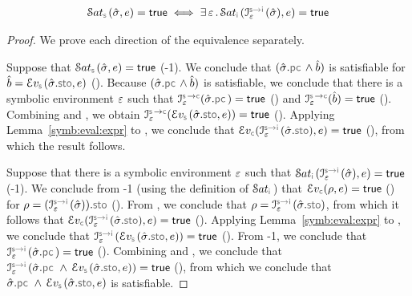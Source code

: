\begin{lemma}
$$
\begin{array}{l}
      \abssat{\symbolic}(\sstate, \jsilexpr) = \jtrue   
      \iff  \exists \, \senv \, . \, 
          \abssat{\instrumented}(\interpret{\symbinst}{\senv}(\sstate), \jsilexpr) = \jtrue
\end{array}
$$
\end{lemma}
\begin{proof}
We prove each direction of the equivalence separately. 
\vspace{5pt}

\noindent {} 
Suppose that $\abssat{\symbolic}(\sstate, \jsilexpr) = \jtrue$ (\hyp{1}).
We conclude that $(\sstate.\pcsel \wedge \sexprb)$ is satisfiable for 
$\sexprb = \evalexpr{\symbolic}(\sstate.\stosel, \jsilexpr)$ (). 
Because  $(\sstate.\pcsel \wedge \sexprb)$  is satisfiable, we conclude that 
there is a symbolic environment $\senv$ such that $\interpret{\symbconc}{\senv}(\sstate.\pcsel) = \jtrue$ ()
and  $\interpret{\symbconc}{\senv}(\sexprb) = \jtrue$ (). 
Combining  and , we obtain $\interpret{\symbconc}{\senv}(\evalexpr{\symbolic}(\sstate.\stosel, \jsilexpr)) = \jtrue$  (). 
Applying Lemma~\ref{symb:eval:expr} to , we conclude that
$\evalexpr{\concrete}(\interpret{\symbinst}{\senv}(\sstate.\stosel), \jsilexpr) = \jtrue$ (), 
from which the result follows. 
\vspace{3pt}

\noindent {} 
Suppose that there is a symbolic environment $\senv$ such that 
$\abssat{\instrumented}(\interpret{\symbinst}{\senv}(\sstate), \jsilexpr) = \jtrue$ (\hyp{1}). 
We conclude from \hyp{1} (using the definition of $\abssat{\instrumented}$) that 
$\evalexpr{\concrete}(\store, \jsilexpr) = \jtrue$ () for 
$\store = (\interpret{\symbinst}{\senv}(\sstate)).\stosel$ (). 
From , we conclude that $\store = \interpret{\symbinst}{\senv}(\sstate.\stosel)$, 
from which it follows that 
$\evalexpr{\concrete}(\interpret{\symbinst}{\senv}(\sstate.\stosel), \jsilexpr) = \jtrue$ (). 
Applying Lemma~\ref{symb:eval:expr} to , we conclude that
$\interpret{\symbinst}{\senv}(\evalexpr{\symbolic}(\sstate.\stosel, \jsilexpr)) = \jtrue$ ().
 From \hyp{1}, we conclude that $\interpret{\symbinst}{\senv}(\sstate.\pcsel) = \jtrue$ (). 
 Combining  and , we conclude that $\interpret{\symbinst}{\senv}(\sstate.\pcsel \, \wedge \, \evalexpr{\symbolic}(\sstate.\stosel, \jsilexpr)) = \jtrue$ (), 
 from which we conclude that $\sstate.\pcsel \, \wedge \, \evalexpr{\symbolic}(\sstate.\stosel, \jsilexpr)$ is satisfiable. 
\end{proof}


